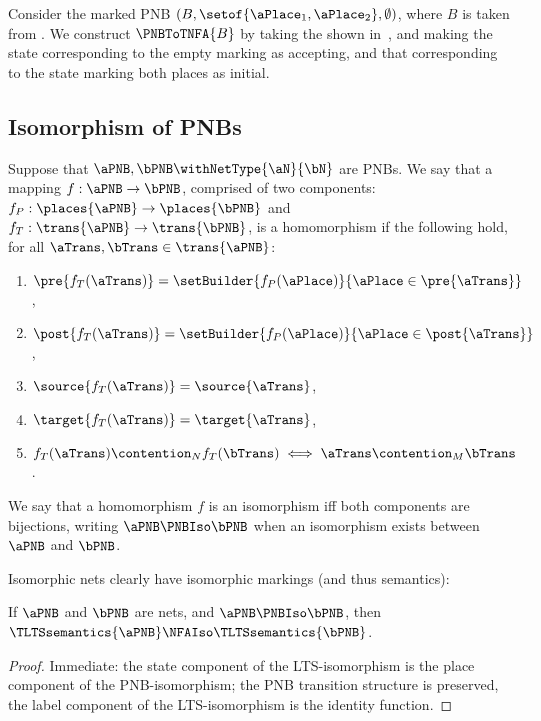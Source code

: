 \begin{example}
    Consider the marked PNB $(B, \setof{\aPlace_1, \aPlace_2}, \emptyset)$,
    where $B$ is taken from . We construct
    $\PNBToTNFA{B}$ by taking the \TLTS{} shown in~,
    and making the state corresponding to the empty marking as accepting, and
    that corresponding to the state marking both places as initial.
\end{example}

\subsection{Isomorphism of PNBs}

Suppose that $\aPNB,\bPNB \withNetType{\aN}{\bN}$ are PNBs. We say that a
mapping $f : \aPNB \to \bPNB$, comprised of two components: $f_P :
\places{\aPNB} \to \places{\bPNB}$ and $f_T : \trans{\aPNB} \to \trans{\bPNB}$,
is a homomorphism if the following hold, for all $\aTrans, \bTrans \in
\trans{\aPNB}$:
\begin{enumerate}
    \item $\pre{f_T(\aTrans)} =  \setBuilder{f_P(\aPlace)}{\aPlace \in
        \pre{\aTrans}}$,
    \item $\post{f_T(\aTrans)} = \setBuilder{f_P(\aPlace)}{\aPlace \in
        \post{\aTrans}}$,
    \item $\source{f_T(\aTrans)} = \source{\aTrans}$,
    \item $\target{f_T(\aTrans)} = \target{\aTrans}$,
    \item $f_T(\aTrans) \contention_N f_T(\bTrans) \iff \aTrans
        \contention_M \bTrans$.
\end{enumerate}

We say that a homomorphism $f$ is an isomorphism iff both components are
bijections, writing $\aPNB \PNBIso \bPNB$ when an isomorphism exists
between $\aPNB$ and $\bPNB$.

Isomorphic nets clearly have isomorphic markings (and thus \TLTS{} semantics):
\begin{lemma}
If $\aPNB$ and $\bPNB$ are nets, and $\aPNB \PNBIso \bPNB$, then
$\TLTSsemantics{\aPNB} \NFAIso \TLTSsemantics{\bPNB}$.
\end{lemma}
\begin{proof}
    Immediate: the state component of the LTS-isomorphism is the place
    component of the PNB-isomorphism; the PNB transition structure is
    preserved, the label component of the LTS-isomorphism is the identity
    function.
\end{proof}

